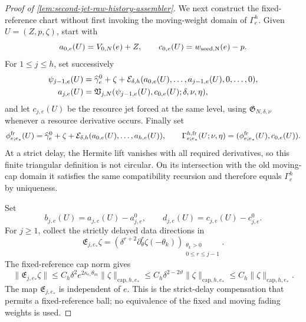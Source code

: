 \begin{proof}[Proof of
\cref{lem:second-jet-raw-history-assembler}]
We next construct the fixed-reference chart without first invoking the
moving-weight domain of \(\Gamma_e^h\).  Given \(U=(Z,p,\zeta)\), start with
\[
 a_{0,e}(U)=V_{0,N}(e)+Z,\qquad
 c_{0,e}(U)=w_{\rm seed,N}(e)-p.
\]
For \(1\le j\le h\), set successively
\begin{align}
 \psi_{j-1,e}(U)
 ={}&\widehat\gamma_e^0+\zeta
   +\mathcal E_{\delta,h}
      (a_{0,e}(U),\ldots,a_{j-1,e}(U),0,\ldots,0),\notag\\
 a_{j,e}(U)
 ={}&\mathfrak V_{j,N}
   (\psi_{j-1,e}(U),c_{0,e}(U);
                         \delta,\nu,\eta),        \label{eq:fixed-reference-collar-jet-recursion}
\end{align}
and let \(c_{j,e}(U)\) be the resource jet forced at the same level, using
\(\mathfrak G_{N,\delta,\nu}\) whenever a resource derivative occurs.
Finally set
\begin{equation}
 \phi_{e;e_*}^{\rm fr}(U)
 =\widehat\gamma_e^0+\zeta
      +\mathcal E_{\delta,h}
          (a_{0,e}(U),\ldots,a_{h,e}(U)),\qquad
 \Gamma_{e;e_*}^{h,\rm fr}(U;\nu,\eta)
 =(\phi_{e;e_*}^{\rm fr}(U),c_{0,e}(U)).          \label{eq:fixed-reference-chart-recursion}
\end{equation}
At a strict delay, the Hermite lift vanishes with all required derivatives,
so this finite triangular definition is not circular.  On its intersection
with the old moving-cap domain it satisfies the same compatibility
recursion and therefore equals \(\Gamma_e^h\) by uniqueness.

Set
\[
 b_{j,e}(U)=a_{j,e}(U)-a_{j,e}^0,\qquad
 d_{j,e}(U)=c_{j,e}(U)-c_{j,e}^0.
\]
For \(j\ge1\), collect the strictly delayed data directions in
\begin{equation}
 \mathfrak E_{j,e_*}\zeta
 =\left(
   \delta^{r+2}\partial_\theta^r\zeta(-\theta_k)
   \right)_{\substack{\theta_k>0\\0\le r\le j-1}}.
                                                               \label{eq:fixed-reference-delayed-direction-map}
\end{equation}
The fixed-reference cap norm gives
\begin{equation}
 \|\mathfrak E_{j,e_*}\zeta\|
 \le C_h\delta^2e^{2\kappa_{e_*}\theta_m}
       \|\zeta\|_{\mathrm{cap},h,e_*}
 \le C_h\delta^{2-2\vartheta}
       \|\zeta\|_{\mathrm{cap},h,e_*}
 \le C_h\|\zeta\|_{\mathrm{cap},h,e_*}.           \label{eq:fixed-reference-delayed-core-bound}
\end{equation}
The map \(\mathfrak E_{j,e_*}\) is independent of \(e\).  This is the
strict-delay compensation that permits a fixed-reference ball; no
equivalence of the fixed and moving fading weights is used.


\end{proof}
